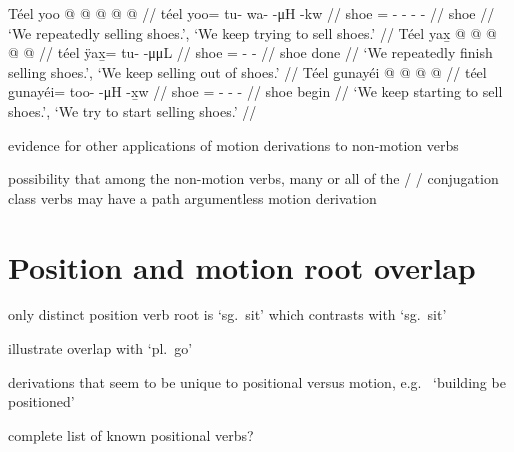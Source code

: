 \documentclass[12pt,letterpaper,oneside,article]{memoir}
\begin{document}
\pex\label{ex:motderiv-beyond-sell-repimpfv}%
\a\label{ex:motderiv-beyond-sell-repimpfv-plain}%
%
\begingl
	\gla	Téel yoo @  @ {} @ {} @ {} @ {} //
	\glb	téel yoo= tu- wa-  -μH -kw //
	\glc	shoe = - -  - - //
	\gld	shoe \•  {} {} {} {} //
	\glft	‘We repeatedly selling shoes.’, ‘We keep trying to sell shoes.’
		//
\endgl
\a\label{ex:motderiv-beyond-sell-impfv-term}%
%
\begingl
	\gla	Téel yax̱ @  @ {} @ {} @ {} @ {} //
	\glb	téel ÿax̱= tu-  -μμL //
	\glc	shoe = -  - //
	\gld	shoe done\·  {} {} {} {} //
	\glft	‘We repeatedly finish selling shoes.’, ‘We keep selling out of shoes.’
		//
\endgl
\a\label{ex:motderiv-beyond-sell-impfv-incep}%
%
\begingl
	\gla	Téel g̱unayéi @  @ {} @ {} @ {} //
	\glb	téel g̱unayéi= too-  -μH -x̱w //
	\glc	shoe = -  - - //
	\gld	shoe begin\·  {} {} {} //
	\glft	‘We keep starting to sell shoes.’, ‘We try to start selling shoes.’
		//
\endgl
\xe



evidence for other applications of motion derivations to non-motion verbs

possibility that among the non-motion verbs, many or all of the  /  /  conjugation class verbs may have a path argumentless motion derivation



\clearpage
\section{Position and motion root overlap}\label{sec:motposroot}

only distinct position verb root is  ‘sg.\ sit’ which contrasts with  ‘sg.\ sit’

illustrate overlap with  ‘pl.\ go’

derivations that seem to be unique to positional versus motion, e.g.\  ‘building be positioned’

complete list of known positional verbs?

\clearpage
\raggedyright
\printbibliography\label{sec:bibliography} 
\end{document}
